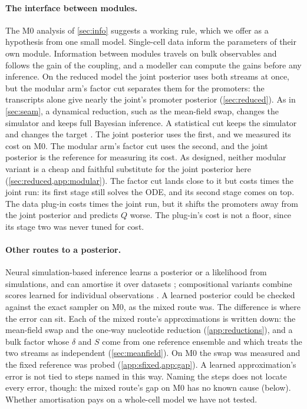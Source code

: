 \paragraph{The interface between modules.} The M0 analysis of \cref{sec:info} suggests a
working rule, which we offer as a hypothesis from one small model. Single-cell data inform the parameters of their own module. Information between modules
travels on bulk observables and follows the gain of the coupling, and a modeller can compute
the gains before any inference. On the reduced model the joint posterior uses both streams at
once, but the modular arm's factor cut separates them for the promoters: the transcripts alone
give nearly the joint's promoter posterior (\cref{sec:reduced}). As in \cref{sec:seam}, a dynamical reduction, such
as the mean-field swap, changes the simulator and keeps full Bayesian inference. A statistical
cut keeps the simulator and changes the target \cite{plummer2015cuts,jacob2017better,carmona2020semimodular}.
The joint posterior uses the first, and we measured its cost on M0. The modular arm's factor
cut uses the second, and the joint posterior is the reference for measuring its cost.
As designed, neither modular variant is a cheap and faithful substitute for the joint
posterior here (\cref{sec:reduced,app:modular}). The factor cut lands close to it but costs
 times the joint run: its first stage still solves the ODE, and its second
stage comes on top. The data plug-in costs  times the joint run, but
it shifts the promoters away from the joint posterior and predicts $Q$ worse. The plug-in's
cost is not a floor, since its stage two was never tuned for cost.

\paragraph{Other routes to a posterior.} Neural simulation-based inference learns a posterior
or a likelihood from simulations, and can amortise it over datasets \cite{cranmer2020frontier};
compositional variants combine scores learned for individual observations
\cite{geffner2023compositional}. A learned posterior could be checked against the exact sampler
on M0, as the mixed route was. The difference is where the error can sit. Each of the mixed
route's approximations is written down: the mean-field swap and the one-way nucleotide
reduction (\cref{app:reductions}), and a bulk factor whose $\delta$ and $S$ come from one
reference ensemble and which treats the two streams as independent (\cref{sec:meanfield}). On M0
the swap was measured and the fixed reference was probed (\cref{app:sfixed,app:gap}). A learned
approximation's error is not tied to steps named in this way. Naming the steps does not locate
every error, though: the mixed route's gap on M0 has no known cause (below). Whether amortisation
pays on a whole-cell model we have not tested.

